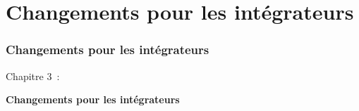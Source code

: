%

\section{Changements pour les intégrateurs}
\begin{frame}[fragile]
	\frametitle{Changements pour les intégrateurs}

	\begin{center}\huge{Chapitre 3~:}\end{center}
	\begin{center}\huge{\color{typo3darkgrey}\textbf{Changements pour les intégrateurs}}\end{center}

\end{frame}


